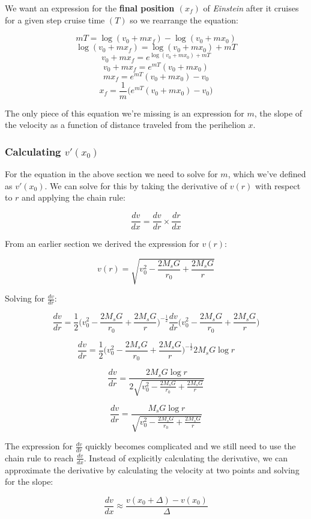 \documentclass[12pt]{article} %
\begin{document}
We want an expression for the \textbf{final position $(x_f)$} of \textit{Einstein} after it cruises for a given step cruise time  $(T)$ so we rearrange the equation:

$$mT = \log{(v_0+mx_f)} - \log{(v_0+mx_0)}$$
$$\log{(v_0+mx_f)} = \log{(v_0+mx_0)} + mT$$
$$v_0 + mx_f = e^{\log{(v_0+mx_0)}+mT}$$
$$v_0 + mx_f = e^{mT}(v_0+mx_0)$$
$$mx_f = e^{mT}(v_0+mx_0) - v_0$$
$$\boxed{x_f = \frac{1}{m}\bigg(e^{mT}(v_0+mx_0) - v_0\bigg)}$$


The only piece of this equation we're missing is an expression for $m$, the slope of the velocity as a function of distance traveled from the perihelion $x$. 

\subsubsection{Calculating $v'(x_0)$}

For the equation in the above section we need to solve for $m$, which we've defined as $v'(x_0)$. We can solve for this by taking the derivative of $v(r)$ with respect to $r$ and applying the chain rule:

$$\frac{dv}{dx} = \frac{dv}{dr}\times\frac{dr}{dx}$$

From an earlier section we derived the expression for $v(r)$:

$$v(r) = \sqrt{v_0^2-\frac{2M_sG}{r_0} + \frac{2M_sG}{r}}$$

Solving for $\frac{dv}{dr}$:

$$\frac{dv}{dr} = \frac{1}{2} \bigg(v_0^2-\frac{2M_sG}{r_0} + \frac{2M_sG}{r}\bigg)^{-\frac{1}{2}}\frac{dv}{dr}\bigg(v_0^2-\frac{2M_sG}{r_0} + \frac{2M_sG}{r}\bigg)$$

$$\frac{dv}{dr} = \frac{1}{2} \bigg(v_0^2-\frac{2M_sG}{r_0} + \frac{2M_sG}{r}\bigg)^{-\frac{1}{2}}2M_sG\log{r}$$

$$\frac{dv}{dr} = \frac{2M_sG \log{r}}{2 \sqrt{v_0^2-\frac{2M_sG}{r_0} + \frac{2M_sG}{r}}}$$

$$\frac{dv}{dr} = \frac{M_sG \log{r}}{ \sqrt{v_0^2-\frac{2M_sG}{r_0} + \frac{2M_sG}{r}}}$$

The expression for $\frac{dv}{dr}$ quickly becomes complicated and we still need to use the chain rule to reach $\frac{dv}{dx}$. Instead of explicitly calculating the derivative, we can approximate the derivative by calculating the velocity at two points and solving for the slope:

$$\frac{dv}{dx} \approx \frac{v(x_0 +\Delta) - v(x_0)}{\Delta}$$
\end{document}
